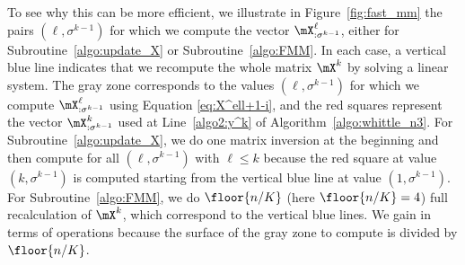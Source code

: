 To see why this can be more efficient, we illustrate in Figure~\ref{fig:fast_mm} the pairs $(\ell,\sigma^{k-1})$ for which we compute the vector $\mX^{\ell}_{: \sigma^{k-1}}$, either for Subroutine~\ref{algo:update_X} or Subroutine~\ref{algo:FMM}.  In each case, a vertical blue line indicates that we recompute the whole matrix $\mX^k$ by solving a linear system.  The gray zone corresponds to the values $(\ell,\sigma^{k-1})$ for which we compute $\mX^\ell_{: \sigma^{k-1}}$ using Equation \eqref{eq:X^ell+1-i}, and the red squares represent the vector $\mX^{k}_{: \sigma^{k-1}}$ used at Line~\ref{algo2:y^k} of Algorithm~\ref{algo:whittle_n3}. For Subroutine~\ref{algo:update_X}, we do one matrix inversion at the beginning and then compute for all $(\ell,\sigma^{k-1})$ with $\ell\le k$ because the red square at value $(k,\sigma^{k-1})$ is computed starting from the vertical blue line at value $(1,\sigma^{k-1})$. For Subroutine~\ref{algo:FMM}, we do $ \floor{n/K}$ (here $ \floor{n/K} =4$) full recalculation of $\mX^k$, which correspond to the vertical blue lines. We gain in terms of operations because the surface of the gray zone to compute is divided by $ \floor{n/K} $.

